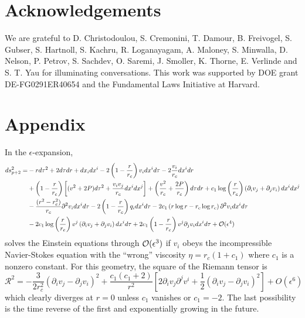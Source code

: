 \documentclass{article}
\def\beq{\begin{equation}}
\def\eeq{\end{equation}}
\def\p{\partial}
\def\e{{\epsilon}}
\begin{document}
\section{Acknowledgements}
We are grateful to D. Christodoulou, S. Cremonini, T. Damour, B. Freivogel, S. Gubser, S. Hartnoll, S. Kachru, R. Loganayagam, A. Maloney, S. Minwalla, D. Nelson, P. Petrov, S. Sachdev, O. Saremi, J. Smoller, K. Thorne, E. Verlinde and S. T. Yau for illuminating conversations. This work was supported by DOE grant DE-FG0291ER40654 and the Fundamental Laws Initiative at Harvard.

%

\appendix
\section{Appendix}\label{appendix}

In the $\epsilon$-expansion,
%
\begin{align}
ds_{p+2}^2 =&-r d\tau^2 + 2 d\tau dr + dx_i dx^i -2\left(1-\frac{r}{r_c}\right) v_i dx^i d\tau -2\frac{v_i}{r_c} dx^i dr \notag\\
&+{\left(1-\frac{r}{r_c}\right)}\left[ (v^2+2P) d\tau^2  +\frac{v_i v_j}{r_c} dx^i dx^j \right] + \left( \frac{v^2}{r_c} +\frac{2P}{r_c}\right) d\tau dr + c_1 \log\left(\frac{r}{r_c}\right) \left( \p_i v_j + \p_j v_i \right)dx^i dx^j  \notag\\
&-{\frac{(r^2 - r_c^2)}{r_c}}\p^2 v_i dx^i d\tau -2\left(1-\frac{r}{r_c}\right) q_i dx^i d\tau - 2 c_1 \left( r \log r - r_c \log r_c \right) \p^2 v_i dx^i d\tau ~\label{wrdmet}\\
&- 2 c_1  \log\left(\frac{r}{r_c}\right) v^j \left(\p_i v_j + \p_j v_i \right) dx^i d\tau + 2 c_1 \left(1 - \frac{r}{r_c} \right) v^j \p_j v_i dx^i d\tau+{\cal O}(\e^4)\notag
\end{align}
%
solves the Einstein equations through ${\cal O}(\e^3)$ if $v_i$ obeys the incompressible Navier-Stokes equation with the ``wrong'' viscosity $\eta=r_c \left(1 + c_1 \right)$ where $c_1$ is a nonzero constant. For this geometry, the square of the Riemann tensor is
%
\beq\label{wrdriesq}
\mathcal{R}^2=- \frac{3}{2 r_c^2} \left(\p_i v_j - \p_j v_i \right)^2 + \frac{c_1 \left(c_1 + 2\right)}{r^2} \left[ 2 \p_i v_j \p^j v^i + \frac{1}{2} \left(\p_i v_j - \p_j v_i \right)^2 \right] + O(\epsilon^6)
\eeq
%
which clearly diverges at $r=0$ unless $c_1$ vanishes or $c_1=-2$. The last possibility is the time reverse of the first and exponentially growing in the future.
%

{}

\end{document}
